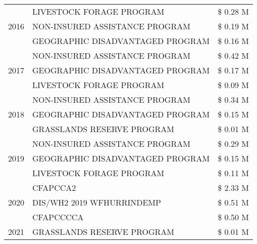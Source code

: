 \begin{tabular}{llr}
\cline{1-3}
\multirow[t]{3}{*}{2016} & LIVESTOCK FORAGE PROGRAM                      & \$ 0.28 M \\
 & NON-INSURED ASSISTANCE PROGRAM                & \$ 0.19 M \\
 & GEOGRAPHIC DISADVANTAGED PROGRAM              & \$ 0.16 M \\
\cline{1-3}
\multirow[t]{3}{*}{2017} & NON-INSURED ASSISTANCE PROGRAM & \$ 0.42 M \\
 & GEOGRAPHIC DISADVANTAGED PROGRAM & \$ 0.17 M \\
 & LIVESTOCK FORAGE PROGRAM & \$ 0.09 M \\
\cline{1-3}
\multirow[t]{3}{*}{2018} & NON-INSURED ASSISTANCE PROGRAM & \$ 0.34 M \\
 & GEOGRAPHIC DISADVANTAGED PROGRAM & \$ 0.15 M \\
 & GRASSLANDS RESERVE PROGRAM & \$ 0.01 M \\
\cline{1-3}
\multirow[t]{3}{*}{2019} & NON-INSURED ASSISTANCE PROGRAM & \$ 0.29 M \\
 & GEOGRAPHIC DISADVANTAGED PROGRAM & \$ 0.15 M \\
 & LIVESTOCK FORAGE PROGRAM & \$ 0.11 M \\
\cline{1-3}
\multirow[t]{3}{*}{2020} & CFAPCCA2 & \$ 2.33 M \\
 & DIS/WH2 2019 WFHURRINDEMP & \$ 0.51 M \\
 & CFAPCCCCA & \$ 0.50 M \\
\cline{1-3}
2021 & GRASSLANDS RESERVE PROGRAM & \$ 0.01 M \\
\cline{1-3}
\bottomrule
\end{tabular}
